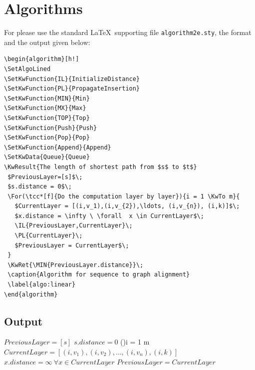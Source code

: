 \documentclass[]{Liebert_Author}
\begin{document}
\section{Algorithms}

For \verb@Algorithms@ please use the standard \LaTeX\ supporting file
\verb!algorithm2e.sty!, the format and the output given below:

\begin{verbatim}
\begin{algorithm}[h!]
\SetAlgoLined
\SetKwFunction{IL}{InitializeDistance}
\SetKwFunction{PL}{PropagateInsertion}
\SetKwFunction{MIN}{Min}
\SetKwFunction{MX}{Max}
\SetKwFunction{TOP}{Top}
\SetKwFunction{Push}{Push}
\SetKwFunction{Pop}{Pop}
\SetKwFunction{Append}{Append}
\SetKwData{Queue}{Queue}
\KwResult{The length of shortest path from $s$ to $t$}
 $PreviousLayer=[s]$\;
 $s.distance = 0$\;
 \For(\tcc*[f]{Do the computation layer by layer}){i = 1 \KwTo m}{
   $CurrentLayer = [(i,v_1),(i,v_{2}),\ldots, (i,v_{n}), (i,k)]$\;
   $x.distance = \infty \ \forall  x \in CurrentLayer$\;
   \IL{PreviousLayer,CurrentLayer}\;
   \PL{CurrentLayer}\;
   $PreviousLayer = CurrentLayer$\;
 }
 \KwRet{\MIN{PreviousLayer.distance}}\;
 \caption{Algorithm for sequence to graph alignment}
 \label{algo:linear}
\end{algorithm}
\end{verbatim}

\subsection*{Output}

\begin{algorithm}[h!]
\SetAlgoLined
{}
 $PreviousLayer=[s]$\;
 $s.distance = 0$\;
 \For(){i = 1 \KwTo m}{
   $CurrentLayer = [(i,v_1),(i,v_{2}),\ldots, (i,v_{n}), (i,k)]$\;
   $x.distance = \infty \ \forall  x \in CurrentLayer$\;
   \;
   \;
   $PreviousLayer = CurrentLayer$\;
 }
 \;
 \caption{Algorithm for sequence to graph alignment}
 \label{algo:linear}
\end{algorithm}
\end{document}
